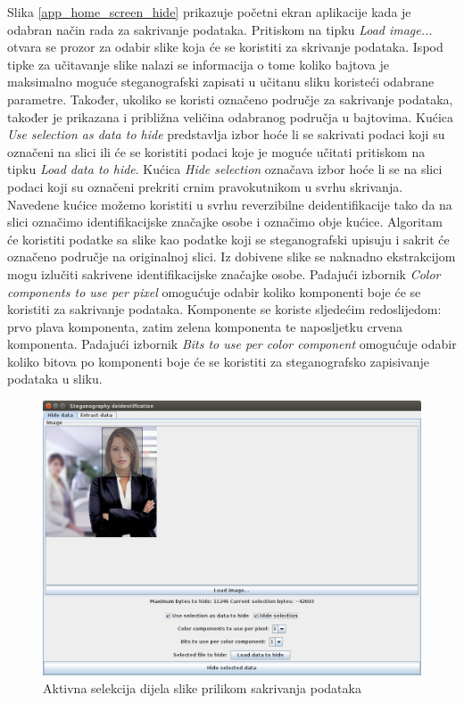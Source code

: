 \documentclass[times, utf8, seminar, numeric]{fer}
\begin{document}
Slika \ref{app_home_screen_hide} prikazuje početni ekran aplikacije kada je odabran način rada za sakrivanje podataka. Pritiskom na tipku \textit{Load image...} otvara se prozor za odabir slike koja će se koristiti za skrivanje podataka. Ispod tipke za učitavanje slike nalazi se informacija o tome koliko bajtova je maksimalno moguće steganografski zapisati u učitanu sliku koristeći odabrane parametre. Također, ukoliko se koristi označeno područje za sakrivanje podataka, također je prikazana i približna veličina odabranog područja u bajtovima. Kućica \textit{Use selection as data to hide} predstavlja izbor hoće li se sakrivati podaci koji su označeni na slici ili će se koristiti podaci koje je moguće učitati pritiskom na tipku \textit{Load data to hide}. Kućica \textit{Hide selection} označava izbor hoće li se na slici podaci koji su označeni prekriti crnim pravokutnikom u svrhu skrivanja. Navedene kućice možemo koristiti u svrhu reverzibilne deidentifikacije tako da na slici označimo identifikacijske značajke osobe i označimo obje kućice. Algoritam će koristiti podatke sa slike kao podatke koji se steganografski upisuju i sakrit će označeno područje na originalnoj slici. Iz dobivene slike se naknadno ekstrakcijom mogu izlučiti sakrivene identifikacijske značajke osobe. Padajući izbornik \textit{Color components to use per pixel} omogućuje odabir koliko komponenti boje će se koristiti za sakrivanje podataka. Komponente se koriste sljedećim redoslijedom: prvo plava komponenta, zatim zelena komponenta te naposljetku crvena komponenta. Padajući izbornik \textit{Bits to use per color component} omogućuje odabir koliko bitova po komponenti boje će se koristiti za steganografsko zapisivanje podataka u sliku. 

\begin{figure}[H]
\caption{Aktivna selekcija dijela slike prilikom sakrivanja podataka}
\label{app_selection_active}
\centerline{\includegraphics[scale=0.4]{images/app_selection_active.png}}
\end{figure}
\end{document}
